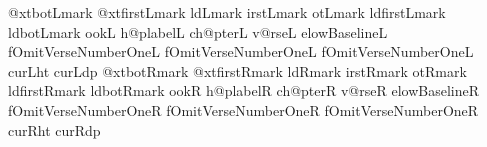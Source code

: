 \def\xdef@cseq#1#2{\x@\xdef\csname #1\endcsname{#2}}%
\def\def@cseq#1#2{\x@\def\csname #1\endcsname{#2}}%
\def\empty@cseq#1{\x@\xdef\csname #1\endcsname{}}%
\def\newsideSpecificIf#1{%
  \x@\def\csname #1true\endcsname{\x@\let\csname if#1\endcsname\iftrue}%
  \x@\def\csname #1false\endcsname{\x@\let\csname if#1\endcsname\iffalse}%
  \x@\def\csname #1default\endcsname{\x@\let\csname if#1\endcsname\undefined}%
}

\def\initcolumndef@ults#1{%
    \empty@cseq{n@xtbot#1mark}%
    \empty@cseq{n@xtfirst#1mark}%
    \empty@cseq{old#1mark}%
    \empty@cseq{first#1mark}%
    \empty@cseq{bot#1mark}%
    \empty@cseq{oldfirst#1mark}%
    \empty@cseq{oldbot#1mark}%
    \empty@cseq{book#1}%
    \empty@cseq{ch@plabel#1}%
    \empty@cseq{@ch@pter#1}%
    \empty@cseq{@v@rse#1}%
    \empty@cseq{BelowBaseline#1}%
    \newsideSpecificIf{OmitVerseNumberOne#1} %
    \xdef@cseq{@cur#1ht}{0pt}%
    \xdef@cseq{@cur#1dp}{0pt}%
    \def@cseq{stylesheet#1}{\gdef\ds@ffix{#1}\stylesh@@t}%
    \x@\def\csname addTo#1Hooks\endcsname{\addToSideHooks{#1}}
}
\initcolumndef@ults{L}%
\initcolumndef@ults{R}%

\def\doVisTrace#1{%
  \setbox0=\vtop to 0pt{\hrule height 0pt depth 0.5pt width 15pt \hbox{\VisTracefont #1 \the\TRACEcount}\vss}\ht0=0pt \dp0=0pt
}
\def\doVisTraceT#1{%
  \setbox0=\vbox to 0pt{\vss\hbox{\VisTracefont #1 \the\TRACEcount}\hrule height 0pt depth 0.5pt width 15pt}\ht0=0pt \dp0=0pt
}

\diglotfalse%
\newif\ifdiglotSepNotes %
\diglotSepNotestrue%
\newif\ifdiglotBalNotes %
\diglotBalNotesfalse%
\newif\iftrialfailed
\global\def\n@xtc@mmand{}%

\newbox\n@xtpartialNrml %
\newbox\n@xtpartialRev %
\let\n@xtpartial=\n@xtpartialNrml

